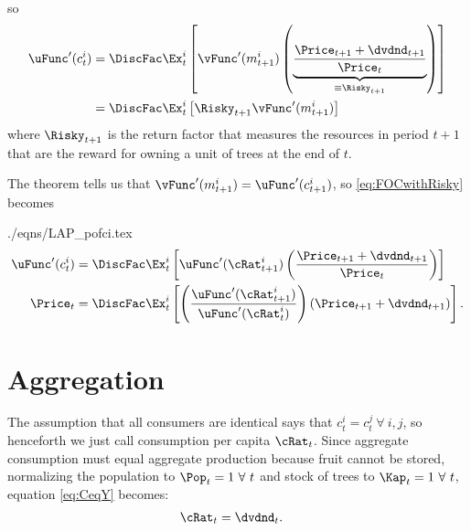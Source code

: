 \documentclass{handout}
\begin{document}
so\hypertarget{FOCwithRisky}{}
\begin{equation}\begin{gathered}\begin{aligned}
 \uFunc^{\prime}(c_{t}^{i}) & =  \DiscFac \Ex_{t}^{i}\left[\vFunc^{\prime}({m}_{t+1}^{i})\left(\underbrace{\frac{{\Price}_{t+1}+\dvdnd_{t+1}}{\Price_{t}}}_{\equiv \Risky_{t+1}}\right)\right] \label{eq:FOCwithRisky}
\\  & =  \DiscFac \Ex_{t}^{i}\left[\Risky_{t+1} \vFunc^{\prime}({m}_{t+1}^{i})\right] 
\end{aligned}\end{gathered}\end{equation}
where $\Risky_{t+1}$ is the return factor that measures the resources in period $t+1$ that are the reward for 
owning a unit of trees at the end of $t$.

The  theorem tells us that  \hypertarget{pofci}{}
$\vFunc^{\prime}({m}_{t+1}^{i})=\uFunc^{\prime}(c_{t+1}^{i})$, so \eqref{eq:FOCwithRisky} becomes
\begin{verbatimwrite}{./eqns/LAP_pofci.tex}
\begin{equation}\begin{gathered}\begin{aligned}
\uFunc^{\prime}(c_{t}^{i}) & =  \DiscFac \Ex_{t}^{i}\left[\uFunc^{\prime}(\cRat_{t+1}^{i})\left(\frac{{\Price}_{t+1}+\dvdnd_{t+1}}{\Price_{t}}\right)\right]  
\\ \Price_{t} & =  \DiscFac \Ex_{t}^{i}
\left[
  \left(
    \frac{\uFunc^{\prime}(\cRat_{t+1}^{i})}{\uFunc^{\prime}(\cRat_{t}^{i})}
  \right)
  \left({\Price}_{t+1}+\dvdnd_{t+1}\right) \label{eq:pofci}
\right] .
\end{aligned}\end{gathered}\end{equation}
\end{verbatimwrite}



\section{Aggregation}

The assumption that all consumers are identical says that $c_{t}^{i} =
c_{t}^{j}~\forall~i,j$, so henceforth we just call consumption per capita $\cRat_{t}$.  Since aggregate consumption must equal aggregate production because fruit cannot be stored, normalizing the population to $\Pop_{t}=1 ~\forall ~ t$ and stock of trees to $\Kap_{t}=1 ~\forall~t$, equation \eqref{eq:CeqY} becomes:
\begin{equation}\begin{gathered}\begin{aligned}
\cRat_{t} & =  \dvdnd_{t}.
\end{aligned}\end{gathered}\end{equation}
\end{document}
